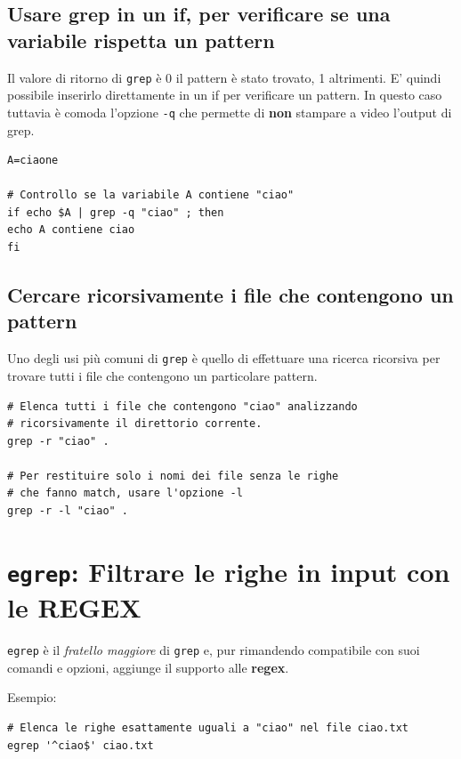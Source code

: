 \documentclass[a4paper]{report}
\newenvironment{code}{\begin{tcolorbox}[size=small]}{\end{tcolorbox}}
\begin{document}
\subsection{Usare grep in un if, per verificare se una variabile rispetta un pattern}
Il valore di ritorno di \texttt{grep} è 0 il pattern è stato trovato, 1 altrimenti. E' quindi possibile inserirlo direttamente in un if per verificare un pattern. In questo caso tuttavia è comoda l'opzione \texttt{-q} che permette di \textbf{non} stampare a video l'output di grep.

\begin{code}
\begin{lstlisting}
A=ciaone

# Controllo se la variabile A contiene "ciao"
if echo $A | grep -q "ciao" ; then
echo A contiene ciao
fi
\end{lstlisting}
\end{code}

\subsection{Cercare ricorsivamente i file che contengono un pattern}
Uno degli usi più comuni di \texttt{grep} è quello di effettuare una ricerca ricorsiva per trovare tutti i file che contengono un particolare pattern.

\begin{code}
\begin{lstlisting}
# Elenca tutti i file che contengono "ciao" analizzando
# ricorsivamente il direttorio corrente.
grep -r "ciao" .

# Per restituire solo i nomi dei file senza le righe
# che fanno match, usare l'opzione -l
grep -r -l "ciao" .
\end{lstlisting}
\end{code}

\section{\texttt{egrep}: Filtrare le righe in input con le REGEX}

\texttt{egrep} è il \textit{fratello maggiore} di \texttt{grep} e, pur rimandendo compatibile con suoi comandi e opzioni, aggiunge il supporto alle \textbf{regex}.

Esempio:

\begin{code}
\begin{lstlisting}
# Elenca le righe esattamente uguali a "ciao" nel file ciao.txt
egrep '^ciao$' ciao.txt
\end{lstlisting}
\end{code}
\end{document}

